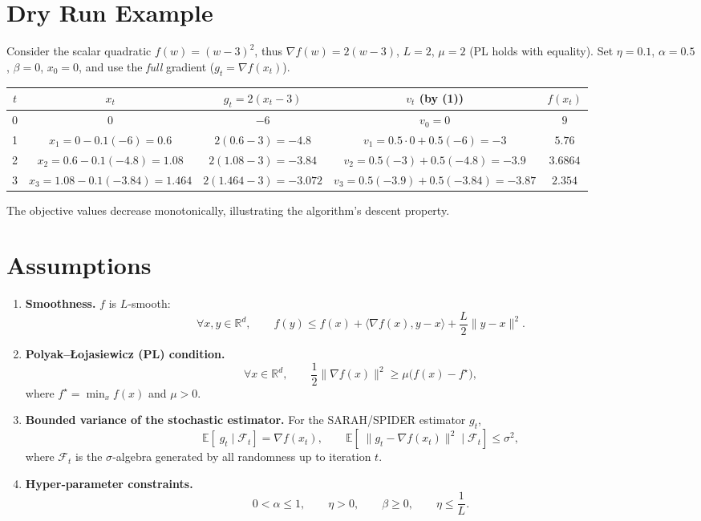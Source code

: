 \documentclass{article}
\newcommand{\EE}{\mathbb{E}}
\newcommand{\RR}{\mathbb{R}}
\begin{document}
\section*{Dry Run Example}
Consider the scalar quadratic $f(w)=(w-3)^{2}$, thus $\nabla f(w)=2(w-3)$, $L=2$, $\mu=2$ (PL holds with equality).  
Set $\eta=0.1$, $\alpha=0.5$, $\beta=0$, $x_{0}=0$, and use the \emph{full} gradient ($g_{t}=\nabla f(x_{t})$).

\begin{center}
\begin{tabular}{c|c|c|c|c}
$t$ & $x_{t}$ & $g_{t}=2(x_{t}-3)$ & $v_{t}$ (by (1)) & $f(x_{t})$\\\hline
0 & $0$ & $-6$ & $v_{0}=0$ & $9$\\
1 & $x_{1}=0-0.1(-6)=0.6$ & $2(0.6-3)=-4.8$ & $v_{1}=0.5\cdot0+0.5(-6)=-3$ & $5.76$\\
2 & $x_{2}=0.6-0.1(-4.8)=1.08$ & $2(1.08-3)=-3.84$ & $v_{2}=0.5(-3)+0.5(-4.8)=-3.9$ & $3.6864$\\
3 & $x_{3}=1.08-0.1(-3.84)=1.464$ & $2(1.464-3)=-3.072$ & $v_{3}=0.5(-3.9)+0.5(-3.84)=-3.87$ & $2.354$\\
\end{tabular}
\end{center}
The objective values decrease monotonically, illustrating the algorithm’s descent property.

\newpage
\section*{Assumptions}
\begin{enumerate}
\item \textbf{Smoothness.} $f$ is $L$‑smooth:
\[
\forall x,y\in\RR^{d},\qquad 
f(y)\le f(x)+\langle\nabla f(x),y-x\rangle+\frac{L}{2}\|y-x\|^{2}.
\tag{A1}
\]
\item \textbf{Polyak–Łojasiewicz (PL) condition.}
\[
\forall x\in\RR^{d},\qquad 
\frac{1}{2}\|\nabla f(x)\|^{2}\ge \mu\bigl(f(x)-f^{\star}\bigr),
\tag{A2}
\]
where $f^{\star}= \min_{x}f(x)$ and $\mu>0$.
\item \textbf{Bounded variance of the stochastic estimator.} For the SARAH/SPIDER estimator $g_{t}$,
\[
\EE\!\left[\;g_{t}\mid \mathcal{F}_{t}\right]=\nabla f(x_{t}),\qquad 
\EE\!\left[\;\|g_{t}-\nabla f(x_{t})\|^{2}\mid\mathcal{F}_{t}\right]\le\sigma^{2},
\tag{A3}
\]
where $\mathcal{F}_{t}$ is the $\sigma$‑algebra generated by all randomness up to iteration $t$.
\item \textbf{Hyper‑parameter constraints.}
\[
0<\alpha\le1,\qquad \eta>0,\qquad \beta\ge0,\qquad 
\eta\le\frac{1}{L}.
\tag{A4}
\]
\end{enumerate}
\end{document}
